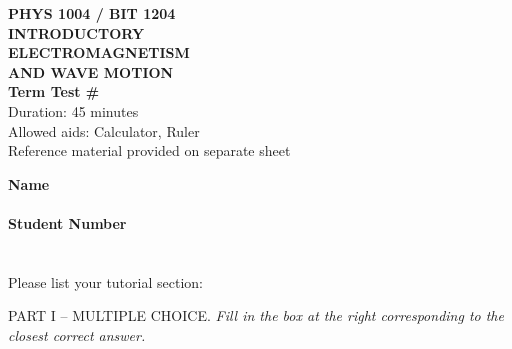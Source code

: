 \clearpage
\begin{minipage}[t]{0.5\textwidth}
\textbf{PHYS 1004 / BIT 1204 \\
INTRODUCTORY \\ 
ELECTROMAGNETISM \\
AND WAVE MOTION} \\
\textbf{Term Test \# \testNumber}  \\ %
Duration: 45 minutes \\
Allowed aids: Calculator, Ruler \\
Reference material provided on separate sheet \\
\vspace{0.2cm}
\end{minipage}
\begin{minipage}[t]{0.5\textwidth}
\textbf{Name}\hrulefill \\
\\
\textbf{Student Number}\hrulefill \\
\\
%
%
\small
\currentTutorial \\
Please list your tutorial section: \hrulefill \\
\end{minipage}

PART I -- MULTIPLE CHOICE. 
\textit{Fill in the box at the right corresponding to the closest correct answer.}
